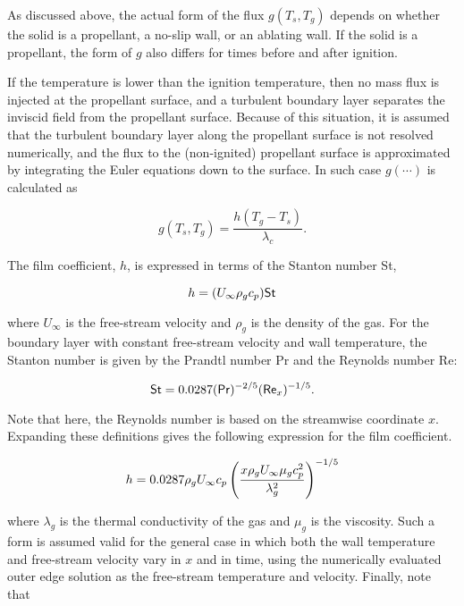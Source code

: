
As discussed above, the actual form of the flux $g(T_s,T_g)$ depends on whether the solid is a propellant, a no-slip wall, or an ablating wall. If the solid is a propellant, the form of $g$ also differs for times before and after ignition.


If the temperature is lower than the ignition temperature, then no mass flux is injected at the propellant surface, and a turbulent boundary layer separates the inviscid field from the propellant surface. Because of this situation, it is assumed that the turbulent boundary layer along the propellant surface is not resolved numerically, and the flux to the (non-ignited) propellant surface is  approximated by integrating the Euler equations down to the surface. In such case $g(\cdots)$ is calculated as

\begin{equation}
g(T_s,T_g) = \frac{h (T_g - T_s)}{\lambda_c}.
\label{eq:qc}
\end{equation}

The film coefficient, $h$, is expressed in terms of the Stanton number {\sf St}, 

\begin{equation}
h = (U_\infty\rho_g c_p){\sf St}
\label{eq:hfilmcoeff}
\end{equation}

where $U_\infty$ is the free-stream velocity and $\rho_g$ is the density of the gas. For the boundary layer with constant free-stream velocity and wall temperature, the Stanton number is given by the Prandtl number {\sf Pr} and the Reynolds number {\sf Re}:

\begin{equation}
{\sf St} = 0.0287({\sf Pr})^{-2/5}({\sf Re}_{x})^{-1/5}.
\label{eq:stnum}
\end{equation}

Note that here, the Reynolds number is based on the streamwise coordinate $x$. Expanding these definitions gives the following expression for the film coefficient.

\begin{equation}
h=0.0287\rho_g U_\infty c_p\left(x\rho_g U_\infty\mu_g c_p^2\over \lambda_g^2\right)^{-1/5}
\label{eq:hfilmcoefffull}
\end{equation}

where $\lambda_g$ is the thermal conductivity of the gas and $\mu_g$ is the viscosity. Such a form is assumed valid for the general case in which both the wall temperature and free-stream velocity vary in $x$ and in time, using the numerically evaluated outer edge solution as the free-stream temperature and velocity. Finally, note that

